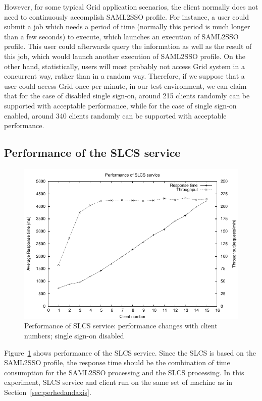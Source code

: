 \documentclass[conference]{IEEEtran}
\begin{document}
However, for some typical Grid application scenarios, the client normally does
not need to continuously accomplish SAML2SSO profile. For instance, a user could submit a
job which needs a period of time (normally this period is much longer than a few
seconds) to execute, which launches an execution of SAML2SSO profile. 
This user could afterwards query the information as well as the result of
this job, which would launch another execution of SAML2SSO profile. On the other hand,
statistically, users will most probably not access Grid system in a concurrent way, rather than in a random way.
Therefore, if we suppose that a user could access Grid once per minute, in our test environment, we
can claim that for the case of disabled single sign-on, around 215 clients randomly can be 
supported with acceptable performance, while for the case of single sign-on enabled, around 340 
clients randomly can be supported with acceptable performance.

\subsection{Performance of the SLCS service}
\label{sec:perfslcsserv}

\begin{figure}
\includegraphics[width=0.9\columnwidth]{SLCS_thread_all.pdf}
\caption{Performance of SLCS service: performance changes with client numbers; single sign-on disabled}
\label{fig:SLCS_thread_all}
\end{figure}

Figure~\ref{fig:SLCS_thread_all} shows performance of the SLCS service.
Since the SLCS is based on the SAML2SSO profile, the response time should be the combination of
time consumption for the SAML2SSO processing and the SLCS processing. In this experiment, SLCS
service and client run on the same set of machine as in Section~\ref{sec:perhedandaxis}. 
\end{document}
